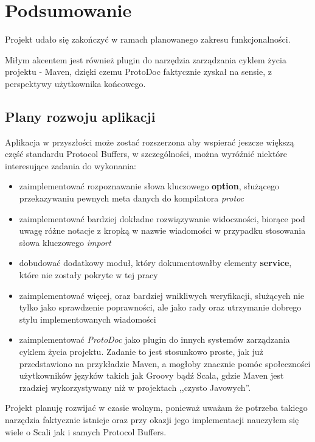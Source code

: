\documentclass[pdflatex,11pt]{aghdpl}
\begin{document}
\chapter{Podsumowanie}
Projekt udało się zakończyć w ramach planowanego zakresu funkcjonalności. 

Miłym akcentem jest również plugin do narzędzia zarządzania cyklem życia projektu - Maven,
dzięki czemu ProtoDoc faktycznie zyskał na sensie, z perspektywy użytkownika końcowego.

\section{Plany rozwoju aplikacji}
Aplikacja w przyszłości może zostać rozszerzona aby wspierać jeszcze większą część standardu 
Protocol Buffers, w szczególności, można wyróźnić niektóre interesujące zadania do wykonania:

\begin{itemize}
 \item zaimplementować rozpoznawanie słowa kluczowego \textbf{option}, służącego przekazywaniu pewnych meta danych do kompilatora \textit{protoc}
 \item zaimplementować bardziej dokładne rozwiązywanie widoczności, biorące pod uwagę różne notacje z kropką w nazwie wiadomości
       w przypadku stosowania słowa kluczowego \textit{import}
 \item dobudować dodatkowy moduł, który dokumentowałby elementy \textbf{service}, które nie zostały pokryte w tej pracy
 \item zaimplementować więcej, oraz bardziej wnikliwych weryfikacji, służących nie tylko jako sprawdzenie poprawności, ale jako rady oraz utrzymanie dobrego stylu
       implementowanych wiadomości
 \item zaimplementować \textit{ProtoDoc} jako plugin do innych systemów zarządzania cyklem życia projektu. Zadanie to jest stosunkowo proste, 
       jak już przedstawiono na przykładzie Maven, a mogłoby znacznie pomóc społeczności użytkowników języków takich jak Groovy bądź Scala, gdzie Maven 
       jest rzadziej wykorzystywany niż w projektach ,,czysto Javowych''.
\end{itemize}

Projekt planuję rozwijać w czasie wolnym, ponieważ uważam że potrzeba takiego narzędzia faktycznie istnieje oraz przy okazji jego 
implementacji nauczyłem się wiele o Scali jak i samych Protocol Buffers.


\appendix





\end{document}
